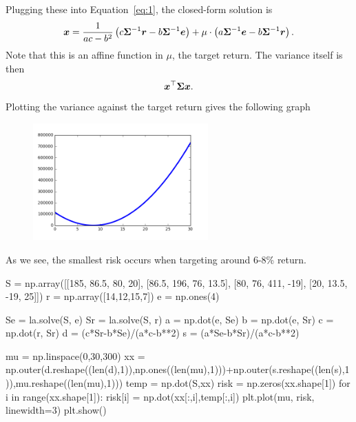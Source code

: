 \documentclass{article}
\begin{document}
Plugging these into Equation~\eqref{eq:1}, the closed-form solution is
\begin{equation*}
 \bm{x} = \frac{1}{ac-b^2} \left(c\bm{\Sigma}^{-1}\bm{r}-b\bm{\Sigma}^{-1}\bm{e}\right)+\mu\cdot \left(a\bm{\Sigma}^{-1}\bm{e}-b\bm{\Sigma}^{-1}\bm{r}\right).
\end{equation*}
Note that this is an affine function in $\mu$, the target return. The variance itself is then
\begin{equation*}
 \bm{x}^{\top}\bm{\Sigma}\bm{x}.
\end{equation*}
Plotting the variance against the target return gives the following graph
\begin{figure}[h!]
 \centering
 \includegraphics[width=0.6\textwidth]{images/tradeoff.png}
\end{figure}
As we see, the smallest risk occurs when targeting around 6-8\% return.

\begin{ipythonnb}
S = np.array([[185, 86.5, 80, 20],
    [86.5, 196, 76, 13.5],
    [80, 76, 411, -19],
    [20, 13.5, -19, 25]])
r = np.array([14,12,15,7])
e = np.ones(4)
\end{ipythonnb}

\begin{ipythonnb}
Se = la.solve(S, e)
Sr = la.solve(S, r)
a = np.dot(e, Se)
b = np.dot(e, Sr)
c = np.dot(r, Sr)
d = (c*Sr-b*Se)/(a*c-b**2)
s = (a*Se-b*Sr)/(a*c-b**2)
\end{ipythonnb}

\begin{ipythonnb}
mu = np.linspace(0,30,300)
xx = np.outer(d.reshape((len(d),1)),np.ones((len(mu),1)))+np.outer(s.reshape((len(s),1)),mu.reshape((len(mu),1)))
temp = np.dot(S,xx)
risk = np.zeros(xx.shape[1])
for i in range(xx.shape[1]):
    risk[i] = np.dot(xx[:,i],temp[:,i])
plt.plot(mu, risk, linewidth=3)
plt.show()
\end{ipythonnb}
\end{document}
